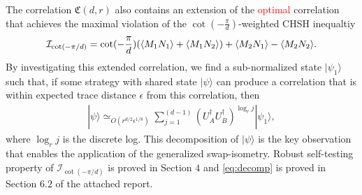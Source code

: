 \documentclass[11pt,letterpaper]{article}
\newcommand{\ket}[1]{|#1\rangle}
\newcommand{\ct}{^{\dagger}}
\DeclarePairedDelimiter{\ip}{\langle}{\rangle}
\newcommand{\1}{\mathbb{1}}
\newcommand{\nr}{n(r)}
\newcommand{\fC}{\mathfrak{C}}
\newcommand{\I}{\mathcal{I}}
\newcommand{\ep}{\epsilon}
\newcommand{\qe}{\epsilon^{1/4}}
\newcommand{\sd}{\sqrt{d}}
\newcommand{\appd}[1]{\simeq_{#1}}
\newcommand{\hf}[1]{\textcolor{red}{#1}}
\theoremstyle{definition}
\begin{document}
The correlation $\fC(d,r)$ also contains an extension of the \hf{optimal} correlation 
that achieves the maximal violation of the $\cot(-\frac{\pi}{d})$-weighted CHSH inequaltiy \cite{pal2010}
\begin{align*}
    \I_{\cot(-\pi/d)} = \cot(-\frac{\pi}{d})(\ip{M_1N_1} + \ip{M_1N_2}) + \ip{M_2N_1} - \ip{M_2N_2}.
\end{align*}
By investigating this extended correlation, we find a sub-normalized state
$\ket{\psi_1}$ such that,
if some strategy with shared state $\ket{\psi}$ can produce a correlation that is within
expected trace distance $\ep$ from this correlation, then
\begin{align}
    \label{eq:decomp}
    \ket{\psi} \appd{O( r^{d/2} \ep^{1/8})}
    \sum_{j=1}^{(d-1)} (U_A\ct U_B\ct)^{\log_r j} \ket{\psi_1},
\end{align}
where $\log_r j $ is the discrete log.
This decomposition of $\ket{\psi}$ is the key observation that enables the application of the generalized swap-isometry.  
Robust self-testing property of $\I_{\cot(-\pi/d)}$
is proved in Section $4$ and \cref{eq:decomp} is 
proved in Section $6.2$ of the attached report.
\end{document}
